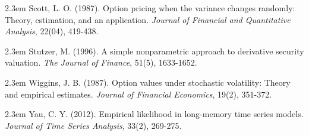 \documentclass[oneside,english]{amsbook}
\numberwithin{section}{chapter}
\numberwithin{equation}{section}
\numberwithin{figure}{section}
\theoremstyle{plain}
\theoremstyle{plain}
\theoremstyle{definition}
\theoremstyle{plain}
\theoremstyle{plain}
\theoremstyle{remark}
\theoremstyle{definition}
\theoremstyle{definition}
\begin{document}
\par\noindent\hangindent2.3em
Scott, L. O. (1987). Option pricing when the variance changes randomly: Theory, estimation, and an application. {\em Journal of Financial and Quantitative Analysis}, 22(04), 419-438.

\par\noindent\hangindent2.3em
Stutzer, M. (1996). A simple nonparametric approach to derivative security valuation. {\em The Journal of Finance}, 51(5), 1633-1652.

\par\noindent\hangindent2.3em
Wiggins, J. B. (1987). Option values under stochastic volatility: Theory and empirical estimates. {\em Journal of Financial Economics}, 19(2), 351-372.

\par\noindent\hangindent2.3em
Yau, C. Y. (2012). Empirical likelihood in long-memory time series models. {\em Journal of Time Series Analysis}, 33(2), 269-275.
\end{document}
